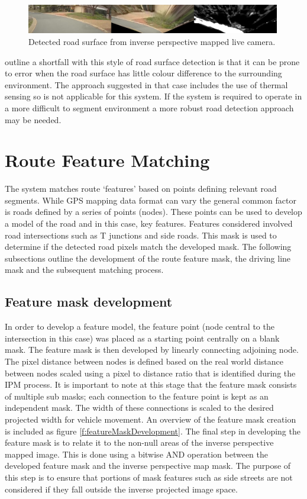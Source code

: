 \documentclass[]{aiaa-tc}%
\begin{document}
\begin{figure}
	\includegraphics[width=0.99\textwidth]{RoadDetection/histRoadLive.png}
	\caption{Detected road surface from inverse perspective mapped live camera.}
	\label{f:histRoadLive}
\end{figure}

\citet{histBackRefineShadows} outline a shortfall with this style of road surface detection is that it can be prone to error when the road surface has little colour difference to the surrounding environment. The approach suggested in that case includes the use of thermal sensing so is not applicable for this system. If the system is required to operate in a more difficult to segment environment a more robust road detection approach may be needed. 


\section{Route Feature Matching}\label{sect:route_feature_matching}

The system matches route `features' based on points defining relevant road segments. While GPS mapping data format can vary the general common factor is roads defined by a series of points (nodes). These points can be used to develop a model of the road and in this case, key features. Features considered involved road intersections such as T junctions and side roads. This mask is used to determine if the detected road pixels match the developed mask. The following subsections outline the development of the route feature mask, the driving line mask and the subsequent matching process.

\subsection{Feature mask development} \label{s:maskDevelopment}

In order to develop a feature model, the feature point (node central to the intersection in this case) was placed as a starting point centrally on a blank mask. The feature mask is then developed by linearly connecting adjoining node. The pixel distance between nodes is defined based on the real world distance between nodes scaled using a pixel to distance ratio that is identified during the IPM process. It is important to note at this stage that the feature mask consists of multiple sub masks; each connection to the feature point is kept as an independent mask. The width of these connections is scaled to the desired projected width for vehicle movement. An overview of the feature mask creation is included as figure \ref{f:featureMaskDevelopment}. The final step in developing the feature mask is to relate it to the non-null areas of the inverse perspective mapped image. This is done using a bitwise AND operation between the developed feature mask and the inverse perspective map mask. The purpose of this step is to ensure that portions of mask features such as side streets are not considered if they fall outside the inverse projected image space. 
\end{document}
